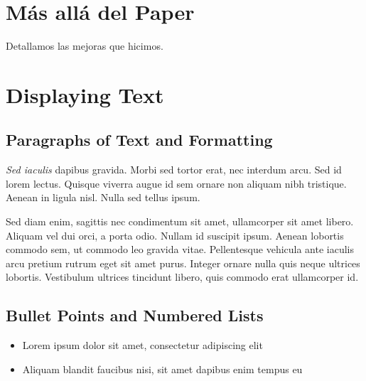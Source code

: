 \documentclass[
paper=128mm:96mm, %
fontsize=11pt, %
pagesize, %
parskip=half-, %
]{scrartcl} %
\newcommand*{\mygreen}[1]{\textcolor{mygreen}{#1}}
\newcommand*{\myblue}[1]{\textcolor{myblue}{#1}}
\newcommand*{\mybrown}[1]{\textcolor{mybrown}{#1}}
\newcommand*{\myred}[1]{\textcolor{myred}{#1}}
\theoremstyle{mythmstyle} %
\begin{document}
\clearpage



\section{M\'as all\'a del Paper}

Detallamos las mejoras que hicimos.


\clearpage


\section{Displaying Text}

\clearpage



\subsection{Paragraphs of Text and Formatting}

\textit{Sed iaculis} dapibus gravida. Morbi sed tortor erat, nec interdum arcu. Sed id lorem lectus. Quisque viverra augue id sem ornare non aliquam nibh tristique. Aenean in ligula nisl. Nulla sed tellus ipsum.

\begin{multicols}{2} %
\mygreen{Sed diam enim, sagittis nec} condimentum sit amet, ullamcorper sit amet libero. \mybrown{Aliquam vel dui orci}, a porta odio. \myred{Nullam id suscipit} ipsum. \myblue{Aenean lobortis} commodo sem, ut commodo leo gravida vitae. Pellentesque vehicula ante iaculis arcu pretium rutrum eget sit amet purus. Integer ornare nulla quis neque ultrices lobortis. Vestibulum ultrices tincidunt libero, quis commodo erat ullamcorper id.
\end{multicols}

\clearpage


\subsection{Bullet Points and Numbered Lists}

\begin{itemize}
\item Lorem ipsum dolor sit amet, consectetur adipiscing elit
\item Aliquam blandit faucibus nisi, sit amet dapibus enim tempus eu
\end{itemize}
\end{document}
